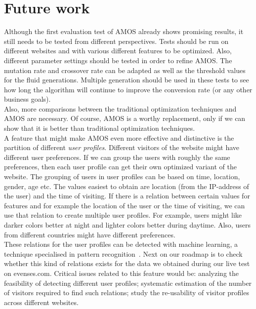 \documentclass{report}
\begin{document}
\section{Future work}
Although the first evaluation test of AMOS already shows promising results, it still needs to be tested from different perspectives. Tests should be run on different websites and with various different features to be optimized. Also, different parameter settings should be tested in order to refine AMOS. The mutation rate and crossover rate can be adapted as well as the threshold values for the fluid generations. Multiple generation should be used in these tests to see how long the algorithm will continue to improve the conversion rate (or any other business goals).\\

Also, more comparisons between the traditional optimization techniques and AMOS are necessary. Of course, AMOS is a worthy replacement, only if we can show that it is better than traditional optimization techniques.\\

A feature that might make AMOS even more effective and distinctive is the partition of different \textit{user profiles}. Different visitors of the website might have different user preferences. If we can group the users with roughly the same preferences, then each user profile can get their own optimized variant of the website. The grouping of users in user profiles can be based on time, location, gender, age etc. The values easiest to obtain are location (from the IP-address of the user) and the time of visiting. If there is a relation between certain values for features and for example the location of the user or the time of visiting, we can use that relation to create multiple user profiles. For example, users might like darker colors better at night and lighter colors better during daytime. Also, users from different countries might have different preferences.\\

These relations for the user profiles can be detected with machine learning, a technique specialised in pattern recognition~\cite{michalski2013machine}. Next on our roadmap is to check whether this kind of relations exists for the data we obtained during our live test on evenses.com. Critical issues related to this feature would be: analyzing the feasibility of detecting different user profiles; systematic estimation of the number of visitors required to find such relations; study the re-usability of visitor profiles across different websites.
 
\end{document}
